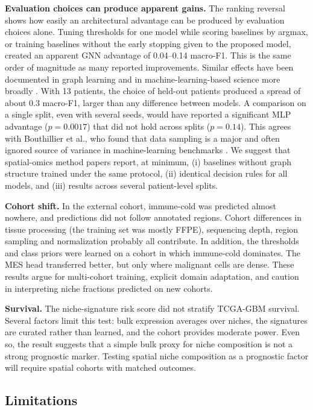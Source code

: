 \documentclass[11pt,letterpaper]{article}
\begin{document}
\textbf{Evaluation choices can produce apparent gains.} The ranking reversal shows how easily an architectural advantage can be produced by evaluation choices alone. Tuning thresholds for one model while scoring baselines by argmax, or training baselines without the early stopping given to the proposed model, created an apparent GNN advantage of 0.04--0.14 macro-F1. This is the same order of magnitude as many reported improvements. Similar effects have been documented in graph learning \cite{shchur2018,errica2020} and in machine-learning-based science more broadly \cite{kapoor2023,varoquaux2022}. With 13 patients, the choice of held-out patients produced a spread of about 0.3 macro-F1, larger than any difference between models. A comparison on a single split, even with several seeds, would have reported a significant MLP advantage ($p = 0.0017$) that did not hold across splits ($p = 0.14$). This agrees with Bouthillier et al., who found that data sampling is a major and often ignored source of variance in machine-learning benchmarks \cite{bouthillier2021}. We suggest that spatial-omics method papers report, at minimum, (i) baselines without graph structure trained under the same protocol, (ii) identical decision rules for all models, and (iii) results across several patient-level splits.

\textbf{Cohort shift.} In the external cohort, immune-cold was predicted almost nowhere, and predictions did not follow annotated regions. Cohort differences in tissue processing (the training set was mostly FFPE), sequencing depth, region sampling and normalization probably all contribute. In addition, the thresholds and class priors were learned on a cohort in which immune-cold dominates. The MES head transferred better, but only where malignant cells are dense. These results argue for multi-cohort training, explicit domain adaptation, and caution in interpreting niche fractions predicted on new cohorts.

\textbf{Survival.} The niche-signature risk score did not stratify TCGA-GBM survival. Several factors limit this test: bulk expression averages over niches, the signatures are curated rather than learned, and the cohort provides moderate power. Even so, the result suggests that a simple bulk proxy for niche composition is not a strong prognostic marker. Testing spatial niche composition as a prognostic factor will require spatial cohorts with matched outcomes.

\subsection{Limitations}
\end{document}
